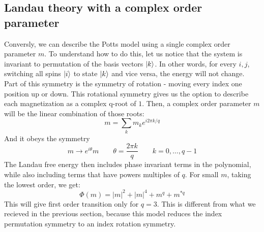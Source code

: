 \documentclass{article}
\begin{document}
\subsection{Landau theory with a complex order parameter}
Conversly, we can describe the Potts model using a single complex order parameter $m$. To understand how to do this, let us notice that the system is invariant to permutation of the basis vectors $\ket{k}$. In other words, for every $i, j$, switching all spins $\ket{i}$ to state $\ket{k}$ and vice versa, the energy will not change. Part of this symmetry is the symmetry of rotation - moving every index one position up or down. This rotational symmetry gives us the option to describe each magnetization as a complex q-root of $1$. Then, a complex order parameter $m$ will be the linear combination of those roots:
\begin{equation}
    m = \sum_k m_k e^{i2\pi k/q}
\end{equation}
And it obeys the symmetry
\begin{equation}
    m \rightarrow e^{i\theta}m
    \qquad
    \theta = \frac{2\pi k}{q}
    \qquad
    k = 0,\dots,q-1
\end{equation}
The Landau free energy then includes phase invariant terms in the polynomial, while also including terms that have powers multiples of $q$. For small $m$, taking the lowest order, we get:
\begin{equation}
    \Phi(m) = |m|^2 + |m|^4 + m^q + m^{*q}
\end{equation}
This will give first order transition only for $q = 3$. This is different from what we recieved in the previous section, because this model reduces the index permutation symmetry to an index rotation symmetry.
\end{document}
